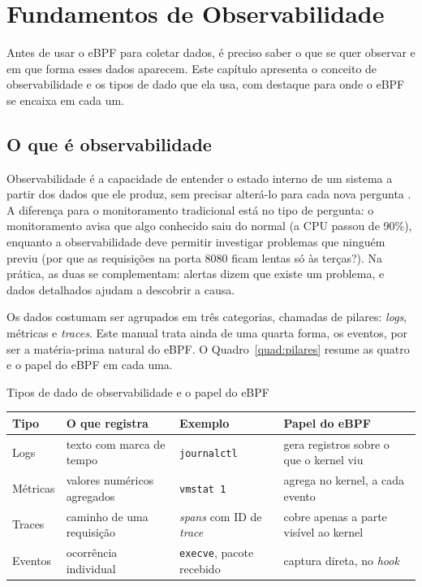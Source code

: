 \chapter{Fundamentos de Observabilidade}\label{cap:fundamentos}

Antes de usar o eBPF para coletar dados, é preciso saber o que se quer observar e em que forma esses dados aparecem. Este capítulo apresenta o conceito de observabilidade e os tipos de dado que ela usa, com destaque para onde o eBPF se encaixa em cada um.

\section{O que é observabilidade}

Observabilidade é a capacidade de entender o estado interno de um sistema a partir dos dados que ele produz, sem precisar alterá-lo para cada nova pergunta \cite{majors2022}. A diferença para o monitoramento tradicional está no tipo de pergunta: o monitoramento avisa que algo conhecido saiu do normal (a CPU passou de 90\%), enquanto a observabilidade deve permitir investigar problemas que ninguém previu (por que as requisições na porta 8080 ficam lentas só às terças?). Na prática, as duas se complementam: alertas dizem que existe um problema, e dados detalhados ajudam a descobrir a causa.

Os dados costumam ser agrupados em três categorias, chamadas de pilares: \textit{logs}, métricas e \textit{traces}. Este manual trata ainda de uma quarta forma, os eventos, por ser a matéria-prima natural do eBPF. O Quadro~\ref{quad:pilares} resume as quatro e o papel do eBPF em cada uma.

\begin{quadro}[htb]
  \caption{Tipos de dado de observabilidade e o papel do eBPF}
  \label{quad:pilares}
  \small
  \begin{tabular}{@{}P{2cm}P{4.6cm}P{3cm}P{4.6cm}@{}}
    \toprule
    \textbf{Tipo} & \textbf{O que registra} & \textbf{Exemplo} & \textbf{Papel do eBPF} \\
    \midrule
    Logs & texto com marca de tempo & \texttt{journalctl} & gera registros sobre o que o kernel viu \\
    Métricas & valores numéricos agregados & \texttt{vmstat 1} & agrega no kernel, a cada evento \\
    Traces & caminho de uma requisição & \textit{spans} com ID de \textit{trace} & cobre apenas a parte visível ao kernel \\
    Eventos & ocorrência individual & \texttt{execve}, pacote recebido & captura direta, no \textit{hook} \\
    \bottomrule
  \end{tabular}
\end{quadro}

